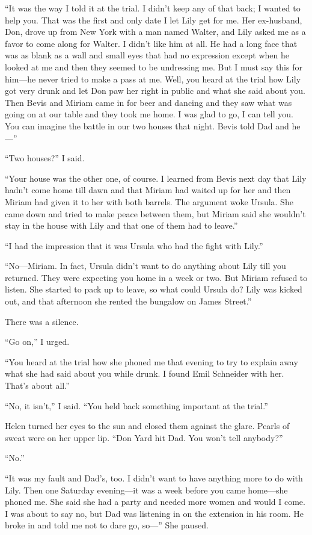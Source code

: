\documentclass{novel}
\begin{document}
{“It was the way I told it at the trial. I didn’t keep any of that back; I wanted to help you. That was the first and only date I let Lily get for me. Her ex-husband, Don, drove up from New York with a man named Walter, and Lily asked me as a favor to come along for Walter. I didn’t like him at all. He had a long face that was as blank as a wall and small eyes that had no expression except when he looked at me and then they seemed to be undressing me. But I must say this for him—he never tried to make a pass at me. Well, you heard at the trial how Lily got very drunk and let Don paw her right in public and what she said about you. Then Bevis and Miriam came in for beer and dancing and they saw what was going on at our table and they took me home. I was glad to go, I can tell you. You can imagine the battle in our two houses that night. Bevis told Dad and he—”

“Two houses?” I said.

“Your house was the other one, of course. I learned from Bevis next day that Lily hadn’t come home till dawn and that Miriam had waited up for her and then Miriam had given it to her with both barrels. The argument woke Ursula. She came down and tried to make peace between them, but Miriam said she wouldn’t stay in the house with Lily and that one of them had to leave.”

“I had the impression that it was Ursula who had the fight with Lily.”

“No—Miriam. In fact, Ursula didn’t want to do anything about Lily till you returned. They were expecting you home in a week or two. But Miriam refused to listen. She started to pack up to leave, so what could Ursula do? Lily was kicked out, and that afternoon she rented the bungalow on James Street.”

There was a silence.

“Go on,” I urged.

“You heard at the trial how she phoned me that evening to try to explain away what she had said about you while drunk. I found Emil Schneider with her. That’s about all.”

“No, it isn’t,” I said. “You held back something important at the trial.”

Helen turned her eyes to the sun and closed them against the glare. Pearls of sweat were on her upper lip. “Don Yard hit Dad. You won’t tell anybody?”

“No.”

“It was my fault and Dad’s, too. I didn’t want to have anything more to do with Lily. Then one Saturday evening—it was a week before you came home—she phoned me. She said she had a party and needed more women and would I come. I was about to say no, but Dad was listening in on the extension in his room. He broke in and told me not to dare go, so—” She paused.

}
\end{document}
